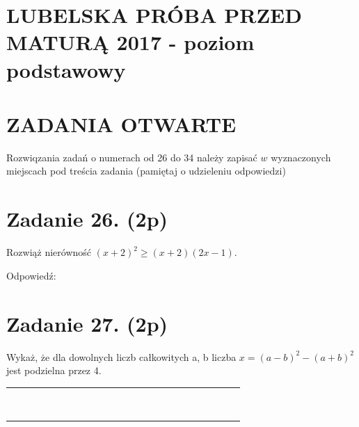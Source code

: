 \documentclass[10pt]{article}
\begin{document}
\section*{LUBELSKA PRÓBA PRZED MATURĄ 2017 - poziom podstawowy}
\section*{ZADANIA OTWARTE}
Rozwiqzania zadań o numerach od 26 do 34 należy zapisać \(w\) wyznaczonych miejscach pod treścia zadania (pamiętaj o udzieleniu odpowiedzi)

\section*{Zadanie 26. (2p)}
Rozwiąż nierówność \((x+2)^{2} \geq(x+2)(2 x-1)\).

Odpowiedź:

\section*{Zadanie 27. (2p)}
Wykaż, że dla dowolnych liczb całkowitych a, b liczba \(x=(a-b)^{2}-(a+b)^{2}\) jest podzielna przez 4.

\begin{center}
\begin{tabular}{|c|c|c|c|c|c|c|c|c|c|c|c|c|c|c|c|c|c|c|c|c|c|c|c|}
\hline
 &  &  &  &  &  &  &  &  &  &  &  &  &  &  &  &  &  &  &  &  &  &  &  \\
\hline
 &  &  &  &  &  &  &  &  &  &  &  &  &  &  &  &  &  &  &  &  &  &  &  \\
\hline
 &  &  &  &  &  &  &  &  &  &  &  &  &  &  &  &  &  &  &  &  &  &  &  \\
\hline
 &  &  &  &  &  &  &  &  &  &  &  &  &  &  &  &  &  &  &  &  &  &  &  \\
\hline
 &  &  &  &  &  &  &  &  &  &  &  &  &  &  &  &  &  &  &  &  &  &  &  \\
\hline
 &  &  &  &  &  &  &  &  &  &  &  &  &  &  &  &  &  &  &  &  &  &  &  \\
\hline
 &  &  &  &  &  &  &  &  &  &  &  &  &  &  &  &  &  &  &  &  &  &  &  \\
\hline
 &  &  &  &  &  &  &  &  &  &  &  &  &  &  &  &  &  &  &  &  &  &  &  \\
\hline
 &  &  &  &  &  &  &  &  &  &  &  &  &  &  &  &  &  &  &  &  &  &  &  \\
\hline
 &  &  &  &  &  &  &  &  &  &  &  &  &  &  &  &  &  &  &  &  &  &  &  \\
\hline
\end{tabular}
\end{center}
\end{document}
